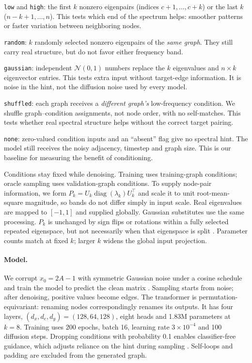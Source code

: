 \documentclass[11pt]{article}
\begin{document}
\noindent\texttt{low} and \texttt{high}: the first $k$ nonzero eigenpairs (indices
$c+1,\ldots,c+k$) or the last $k$ ($n-k+1,\ldots,n$). This tests which end of the spectrum
helps: smoother patterns or faster variation between neighboring nodes.

\noindent\texttt{random}: $k$ randomly selected nonzero eigenpairs of the \emph{same graph}.
They still carry real structure, but do not favor either frequency band.

\noindent\texttt{gaussian}: independent $\mathcal{N}(0,1)$ numbers replace the $k$ eigenvalues
and $n\times k$ eigenvector entries. This tests extra input without target-edge information.
It is noise in the hint, not the diffusion noise used by every model.

\noindent\texttt{shuffled}: each graph receives a \emph{different graph's} low-frequency
condition. We shuffle graph--condition assignments, not node order, with no self-matches.
This tests whether real spectral structure helps without the correct target pairing.

\noindent\texttt{none}: zero-valued condition inputs and an ``absent'' flag give no spectral
hint. The model still receives the noisy adjacency, timestep and graph size. This is our
baseline for measuring the benefit of conditioning.

Conditions stay fixed while denoising. Training uses training-graph conditions; oracle
sampling uses validation-graph conditions. To supply node-pair information, we form
$P_k=U_k\operatorname{diag}(\lambda_k)U_k^\top$ and scale it to unit root-mean-square magnitude,
so bands do not differ simply in input scale. Real eigenvalues are mapped to $[-1,1]$ and
supplied globally. Gaussian substitutes use the same processing. $P_k$ is unchanged by sign
flips or rotations within a fully selected repeated eigenspace, but not necessarily when
that eigenspace is split \citep{lim2023signnet}. Parameter counts match at fixed $k$;
larger $k$ widens the global input projection.

\paragraph{Model.}
\label{sec:model}
We corrupt $x_0=2A-1$ with symmetric Gaussian noise under a cosine schedule and train the
model to predict the clean matrix \citep{ho2020ddpm,nichol2021improved}. Sampling starts from
noise; after denoising, positive values become edges. The transformer is permutation-equivariant:
renaming nodes correspondingly renames its outputs. It has four layers,
$(d_x,d_e,d_y)=(128,64,128)$, eight heads and 1.83M parameters at $k{=}8$.
Training uses 200 epochs, batch 16, learning rate $3\times10^{-4}$ and 100 diffusion steps.
Dropping conditions with probability 0.1 enables classifier-free guidance, which adjusts
reliance on the hint during sampling \citep{ho2022cfg}. Self-loops and padding are excluded
from the generated graph.
\end{document}
